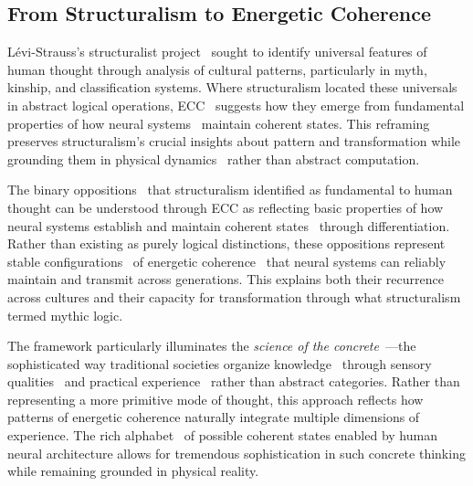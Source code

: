 \subsection*{From Structuralism to Energetic Coherence}

Lévi-Strauss's structuralist project~ sought to identify universal features of human thought through analysis of cultural patterns, particularly in myth, kinship, and classification systems. Where structuralism located these universals in abstract logical operations, ECC~ suggests how they emerge from fundamental properties of how neural systems~ maintain coherent states. This reframing preserves structuralism's crucial insights about pattern and transformation while grounding them in physical dynamics~ rather than abstract computation.

The binary oppositions~ that structuralism identified as fundamental to human thought can be understood through ECC as reflecting basic properties of how neural systems establish and maintain coherent states~ through differentiation. Rather than existing as purely logical distinctions, these oppositions represent stable configurations~ of energetic coherence~ that neural systems can reliably maintain and transmit across generations. This explains both their recurrence across cultures and their capacity for transformation through what structuralism termed mythic logic.

The framework particularly illuminates the \textit{science of the concrete}~—the sophisticated way traditional societies organize knowledge~ through sensory qualities~ and practical experience~ rather than abstract categories. Rather than representing a more primitive mode of thought, this approach reflects how patterns of energetic coherence naturally integrate multiple dimensions of experience. The rich alphabet~ of possible coherent states enabled by human neural architecture allows for tremendous sophistication in such concrete thinking while remaining grounded in physical reality.

